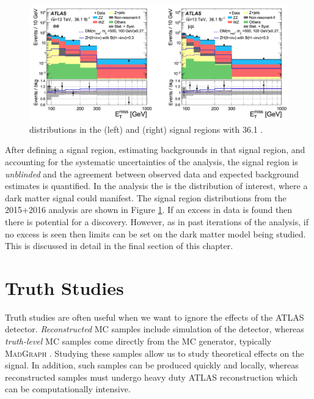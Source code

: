 \begin{figure}[htb]
\centering
\includegraphics[width=1\textwidth]{Figures/srEPS.png}
\caption{\etmiss distributions in the \ee (left) and \mm (right) signal regions with 36.1 \ifb.}
\label{fig:srEPS}
\end{figure}

After defining a signal region, estimating backgrounds in that signal region, and accounting for the systematic uncertainties of the analysis, the signal region is \textit{unblinded} and the agreement between observed data and expected background estimates is quantified. In the \monoZ analysis the \etmiss is the distribution of interest, where a dark matter signal could manifest. The signal region \etmiss distributions from the 2015+2016 analysis are shown in Figure \ref{fig:srEPS}. If an excess in data is found then there is potential for a discovery. However, as in past iterations of the analysis, if no excess is seen then limits can be set on the dark matter model being studied. This is discussed in detail in the final section of this chapter.

\section{Truth Studies} 
\label{sec:truth}

Truth studies are often useful when we want to ignore the effects of the ATLAS detector. \textit{Reconstructed} MC samples include simulation of the detector, whereas \textit{truth-level} MC samples come directly from the MC generator, typically \textsc{MadGraph} \cite{Alwall:2011uj}. Studying these samples allow us to study theoretical effects on the signal. In addition, such samples can be produced quickly and locally, whereas reconstructed samples must undergo heavy duty ATLAS reconstruction which can be computationally intensive. 

